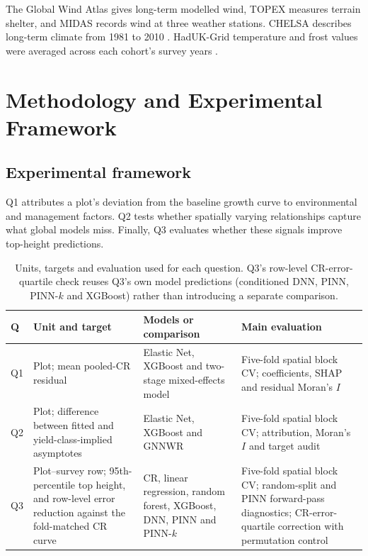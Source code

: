 \documentclass[logo,msc,ai]{infthesis}           %
\begin{document}
The Global Wind Atlas gives long-term modelled wind, TOPEX measures terrain shelter, and MIDAS records wind at three weather stations. CHELSA describes long-term climate from 1981 to 2010 \cite{karger2017CHELSA_C3_LID}. HadUK-Grid temperature and frost values were averaged across each cohort's survey years \cite{hollis2019HadUKGrid_C3_LID}.


\chapter{Methodology and Experimental Framework} \label{ch:methodology}
\section{Experimental framework}
Q1 attributes a plot's deviation from the baseline growth curve to environmental and management factors. Q2 tests whether spatially varying relationships capture what global models miss. Finally, Q3 evaluates whether these signals improve top-height predictions.

\begin{table}[!ht]
\centering
\footnotesize
\renewcommand{\arraystretch}{1.15}

\begin{tabularx}{\linewidth}{@{} l >{\raggedright\arraybackslash}X >{\raggedright\arraybackslash}X >{\raggedright\arraybackslash}X @{}}
\toprule
Q & Unit and target & Models or comparison & Main evaluation \\
\midrule
Q1 & Plot; mean pooled-CR residual & Elastic Net, XGBoost and two-stage
mixed-effects model & Five-fold spatial block CV; coefficients, SHAP and residual Moran's $I$ \\
Q2 & Plot; difference between fitted and yield-class-implied asymptotes & Elastic Net, XGBoost
and GNNWR & Five-fold spatial block CV; attribution, Moran's $I$ and target audit \\
Q3 & Plot--survey row; 95th-percentile top height, and row-level error reduction against the
fold-matched CR curve & CR, linear regression, random forest, XGBoost, DNN, PINN and PINN-$k$
& Five-fold spatial block CV; random-split and PINN forward-pass diagnostics; CR-error-quartile
correction with permutation control \\
\bottomrule
\end{tabularx}
\caption{\small{Units, targets and evaluation used for each question. Q3's row-level CR-error-quartile
check reuses Q3's own model predictions (conditioned DNN, PINN, PINN-$k$ and XGBoost) rather
than introducing a separate comparison.}}
\label{tab:rq-framework}
\end{table}
\end{document}
